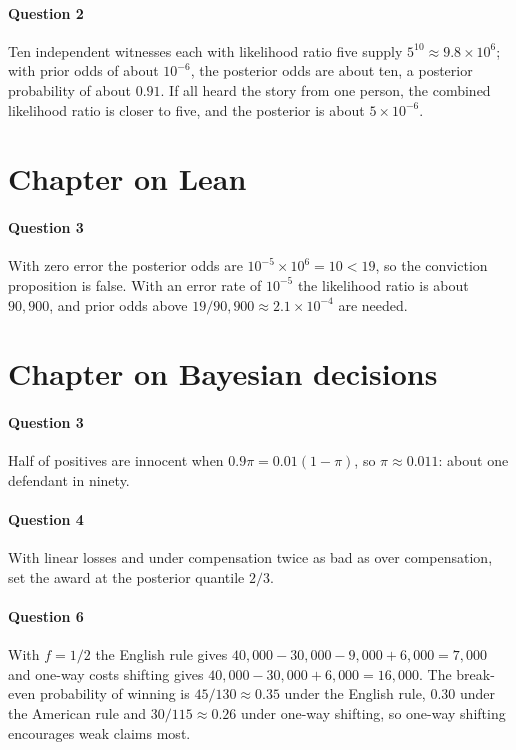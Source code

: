 \paragraph{Question 2} Ten independent witnesses each with likelihood ratio five supply $5^{10}\approx 9.8\times 10^6$; with prior odds of about $10^{-6}$, the posterior odds are about ten, a posterior probability of about $0.91$. If all heard the story from one person, the combined likelihood ratio is closer to five, and the posterior is about $5\times 10^{-6}$.

\section*{Chapter on Lean}
\paragraph{Question 3} With zero error the posterior odds are $10^{-5}\times 10^6 = 10 < 19$, so the conviction proposition is false. With an error rate of $10^{-5}$ the likelihood ratio is about $90{,}900$, and prior odds above $19/90{,}900\approx 2.1\times 10^{-4}$ are needed.

\section*{Chapter on Bayesian decisions}
\paragraph{Question 3} Half of positives are innocent when $0.9\pi = 0.01(1-\pi)$, so $\pi \approx 0.011$: about one defendant in ninety.
\paragraph{Question 4} With linear losses and under compensation twice as bad as over compensation, set the award at the posterior quantile $2/3$.
\paragraph{Question 6} With $f = 1/2$ the English rule gives $40{,}000 - 30{,}000 - 9{,}000 + 6{,}000 = 7{,}000$ and one-way costs shifting gives $40{,}000 - 30{,}000 + 6{,}000 = 16{,}000$. The break-even probability of winning is $45/130 \approx 0.35$ under the English rule, $0.30$ under the American rule and $30/115 \approx 0.26$ under one-way shifting, so one-way shifting encourages weak claims most.

